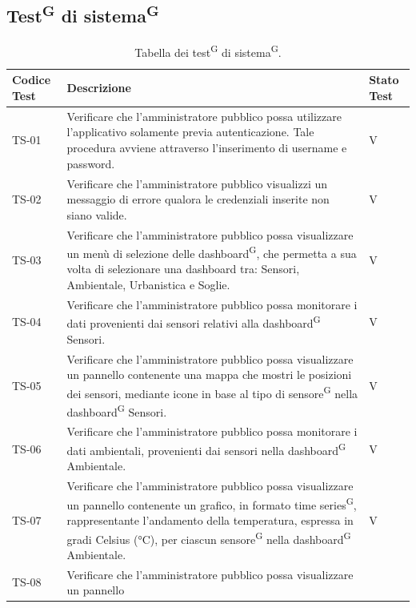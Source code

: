 \documentclass[8pt]{article}
\newcommand{\glossterm}[1]{#1\textsuperscript{G}} %
\begin{document}
\subsection{\glossterm{Test} di \glossterm{sistema}}
\renewcommand{\arraystretch}{2.5}
\begin{longtable}{|>{\centering}p{2cm}|>{\RaggedRight}m{12cm}|>{\centering\arraybackslash}p{2cm}|}
    \hline
    \rowcolor{white}
    \textbf{Codice Test} & \textbf{Descrizione} & \textbf{Stato Test} \\
    \hline
    \endfirsthead 
    \rowcolor{white}
    \caption{Tabella dei \glossterm{test} di \glossterm{sistema}.} 
    \label{table:Tabella dei test di sistema}
    \endlastfoot 
    TS-01 & Verificare che l'amministratore pubblico possa utilizzare l'applicativo solamente previa autenticazione. Tale procedura avviene attraverso l'inserimento di username e password. & V\\
    \hline
    TS-02 & Verificare che l'amministratore pubblico visualizzi un messaggio di errore qualora le credenziali inserite non siano valide. & V\\
    \hline
    TS-03 & Verificare che l'amministratore pubblico possa visualizzare un menù di selezione delle
    \glossterm{dashboard}, che permetta a sua volta di selezionare una dashboard tra: Sensori, Ambientale, Urbanistica e Soglie. & V\\
    \hline
    TS-04 & Verificare che l'amministratore pubblico possa monitorare i dati
    provenienti dai sensori relativi alla \glossterm{dashboard} Sensori.
    & V \\
    \hline
    TS-05 & Verificare che l'amministratore pubblico possa visualizzare un pannello
    contenente una mappa che mostri le posizioni dei sensori, mediante icone in base al tipo di \glossterm{sensore} nella \glossterm{dashboard} Sensori.
    & V \\
    \hline
    TS-06 & Verificare che l'amministratore pubblico possa monitorare i dati ambientali, provenienti
    dai sensori nella \glossterm{dashboard} Ambientale.
    & V \\
    \hline
    TS-07 & Verificare che l'amministratore pubblico possa visualizzare un pannello
    contenente un grafico, in formato \glossterm{time series}, rappresentante l'andamento della temperatura,
    espressa in gradi Celsius (°C), per ciascun \glossterm{sensore} nella \glossterm{dashboard} Ambientale.
    & V \\
    \hline
    TS-08 & Verificare che l'amministratore pubblico possa visualizzare un pannello

\end{longtable}
\end{document}
